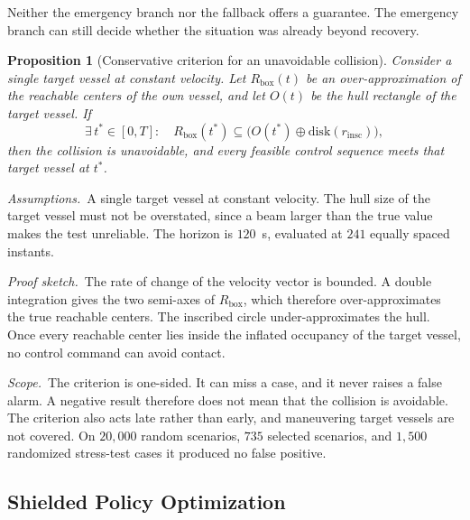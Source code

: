 \documentclass[10pt,letterpaper]{article}
\newtheorem{prop}{Proposition}
\begin{document}
Neither the emergency branch nor the fallback offers a guarantee. The emergency branch
can still decide whether the situation was already beyond recovery.

\begin{prop}[Conservative criterion for an unavoidable collision]\label{prop:imminent}
Consider a single target vessel at constant velocity. Let $R_{\mathrm{box}}(t)$ be an
over-approximation of the reachable centers of the own vessel, and let $O(t)$ be the hull
rectangle of the target vessel. If
\begin{equation}
 \exists\,t^\ast\in[0,T]:\quad R_{\mathrm{box}}(t^\ast)\subseteq\bigl(O(t^\ast)\oplus\mathrm{disk}(r_{\mathrm{insc}})\bigr),
 \label{eq:imminent}
\end{equation}
then the collision is unavoidable, and every feasible control sequence meets that target
vessel at $t^\ast$.
\end{prop}

\noindent\textit{Assumptions.}\ A single target vessel at constant velocity. The hull size
of the target vessel must not be overstated, since a beam larger than the true value makes
the test unreliable. The horizon is $120$~s, evaluated at $241$ equally spaced instants.

\noindent\textit{Proof sketch.}\ The rate of change of the velocity vector is bounded. A
double integration gives the two semi-axes of $R_{\mathrm{box}}$, which therefore
over-approximates the true reachable centers. The inscribed circle under-approximates the
hull. Once every reachable center lies inside the inflated occupancy of the target vessel,
no control command can avoid contact.

\noindent\textit{Scope.}\ The criterion is one-sided. It can miss a case, and it never
raises a false alarm. A negative result therefore does not mean that the collision is
avoidable. The criterion also acts late rather than early, and maneuvering target vessels
are not covered. On $20{,}000$ random scenarios, $735$ selected scenarios, and $1{,}500$ randomized
stress-test cases it produced no false positive.

\subsection{Shielded Policy Optimization}
\label{sec:rl}
\end{document}
